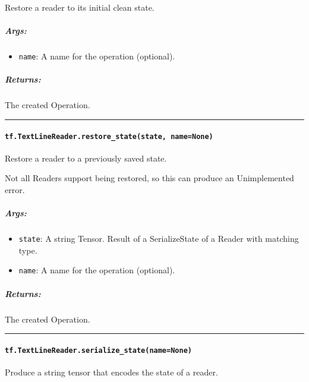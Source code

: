 Restore a reader to its initial clean state.

\subparagraph{Args: }\label{args-12}

\begin{itemize}
\tightlist
\item
  \texttt{name}: A name for the operation (optional).
\end{itemize}

\subparagraph{Returns: }\label{returns-10}

The created Operation.

\begin{center}\rule{0.5\linewidth}{\linethickness}\end{center}

\paragraph{\texorpdfstring{\texttt{tf.TextLineReader.restore\_state(state,\ name=None)}
}{tf.TextLineReader.restore\_state(state, name=None) }}\label{tf.textlinereader.restoreux5fstatestate-namenone}

Restore a reader to a previously saved state.

Not all Readers support being restored, so this can produce an
Unimplemented error.

\subparagraph{Args: }\label{args-13}

\begin{itemize}
\tightlist
\item
  \texttt{state}: A string Tensor. Result of a SerializeState of a
  Reader with matching type.
\item
  \texttt{name}: A name for the operation (optional).
\end{itemize}

\subparagraph{Returns: }\label{returns-11}

The created Operation.

\begin{center}\rule{0.5\linewidth}{\linethickness}\end{center}

\paragraph{\texorpdfstring{\texttt{tf.TextLineReader.serialize\_state(name=None)}
}{tf.TextLineReader.serialize\_state(name=None) }}\label{tf.textlinereader.serializeux5fstatenamenone}

Produce a string tensor that encodes the state of a reader.

